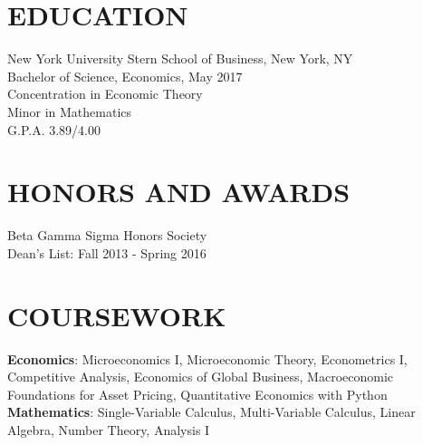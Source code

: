 \documentclass{res}
\begin{document}
 


\address{\bf  PRESENT ADDRESS\\227 E. 21st St, Apt. 2\\New York, NY 10010}
\address{\bf CONTACT INFORMATION \\ (832) 758-7670 \\  michaeldcai@gmail.com \\ michael.cai@stern.nyu.edu}
                                  
\begin{resume}

\section{EDUCATION}          
    New York University Stern School of Business, New York, NY  \\        
    Bachelor of Science, Economics, May 2017   \\       
    Concentration in Economic Theory       \\   
    Minor in Mathematics  \\        
    G.P.A. 3.89/4.00          

\section{HONORS AND AWARDS}          
    Beta Gamma Sigma Honors Society    \\      
    Dean's List: Fall 2013 - Spring 2016    
    
\section{COURSEWORK}
{\bf Economics}: Microeconomics I, Microeconomic Theory, Econometrics I, Competitive Analysis, Economics of Global Business, Macroeconomic Foundations for Asset Pricing, Quantitative Economics with Python \\
{\bf Mathematics}: Single-Variable Calculus, Multi-Variable Calculus, Linear Algebra, Number Theory, Analysis I


\end{resume}
\end{document}
